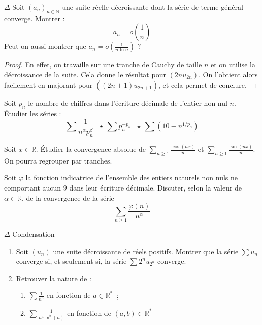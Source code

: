 \documentclass[french,a4paper]{article}
\newcommand{\N}{\mathbb{N}}
\newcommand{\R}{\mathbb{R}}
\newcommand{\st}{^*}
\theoremstyle{plain}
\theoremstyle{definition}
\theoremstyle{remark}
\begin{document}
\begin{ex}{$\Delta$} Soit $(a_n)_{n\in\N}$ une suite réelle décroissante dont la série de terme général converge. Montrer : $$a_n=o\left(\frac{1}{n}\right)$$ Peut-on aussi montrer que $a_n=\displaystyle o\left(\frac{1}{n\ln n}\right)$ ?
\end{ex}

\begin{proof}
	En effet, on travaille sur une tranche de Cauchy de taille $n$ et on utilise la décroissance de la suite. Cela donne le résultat pour $(2nu_{2n})$. On l'obtient alors facilement en majorant pour $((2n+1)u_{2n+1})$, et cela permet de conclure.
\end{proof}

\begin{ex}{}
	Soit $p_n$ le nombre de chiffres dans l'écriture décimale de l'entier non nul $n$. Étudier les séries : $$ \sum\frac{1}{n^\alpha p_n^\beta}\ \ \ \star\ \sum p_n^{-p_n}\ \ \ \star\ \sum\left(10-n^{1/p_n}\right)$$
\end{ex}

\begin{ex}{}
	Soit $x\in\R$. Étudier la convergence absolue de $\displaystyle\sum_{n\geqslant 1}\frac{\cos(nx)}{n}$ et $\displaystyle\sum_{n\geqslant 1}\frac{\sin(nx)}{n}$. On pourra regrouper par tranches.
\end{ex}

\begin{ex}{}
	Soit $\varphi$ la fonction indicatrice de l'ensemble des entiers naturels non nuls ne comportant aucun $9$ dans leur écriture décimale. Discuter, selon la valeur de $\alpha\in\R$, de la convergence de la série $$\sum_{n\geqslant 1}\frac{\varphi(n)}{n^\alpha}$$
\end{ex}

\begin{ex}{$\Delta$ Condensation}
	\begin{enumerate}
		\item Soit $(u_n)$ une suite décroissante de réels positifs. Montrer que la série $\sum u_n$ converge si, et seulement si, la série $\sum 2^nu_{2^n}$ converge.
		\item Retrouver la nature de :
		\begin{enumerate}
			\item $\displaystyle\sum\frac{1}{n^a}$ en fonction de $a\in\R_+\st$ ;
			\item $\displaystyle\sum\frac{1}{n^a\ln^b(n)}$ en fonction de $(a,b)\in\R_+\st$
		\end{enumerate}
	\end{enumerate}
\end{ex}
\end{document}
